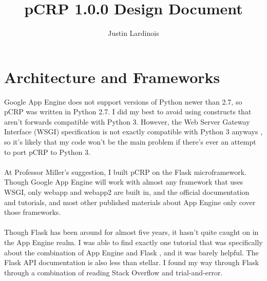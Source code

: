 \documentclass[12pt]{article}
\title{pCRP 1.0.0 Design Document}
\author{Justin Lardinois}
\date{}
\begin{document}
\maketitle

\section{Architecture and Frameworks}
	Google App Engine does not support versions of Python newer than 2.7, so
	pCRP was written in Python 2.7. I did my best to avoid using constructs
	that aren't forwards compatible with Python 3. However, the Web Server
	Gateway Interface (WSGI) specification is not exactly compatible with
	Python 3 anyways \cite{python3}, so it's likely that my code won't be
	the main problem if there's ever an attempt to port pCRP to Python 3.
	\\\\
	At Professor Miller's suggestion, I built pCRP on the Flask
	microframework. Though Google App Engine will work with almost any
	framework that uses WSGI, only webapp and webapp2 are built in, and
	the official documentation and tutorials, and most other published
	materials about App Engine only cover those frameworks.
	\\\\
	Though Flask has been around for almost five years, it hasn't quite
	caught on in the App Engine realm. I was able to find exactly one
	tutorial that was specifically about the combination of App Engine
	and Flask \cite{souza}, and it was barely helpful. The Flask API
	documentation \cite{flask} is also less than stellar. I found my
	way through Flask through a combination of reading Stack Overflow
	and trial-and-error.
	



\end{document}
